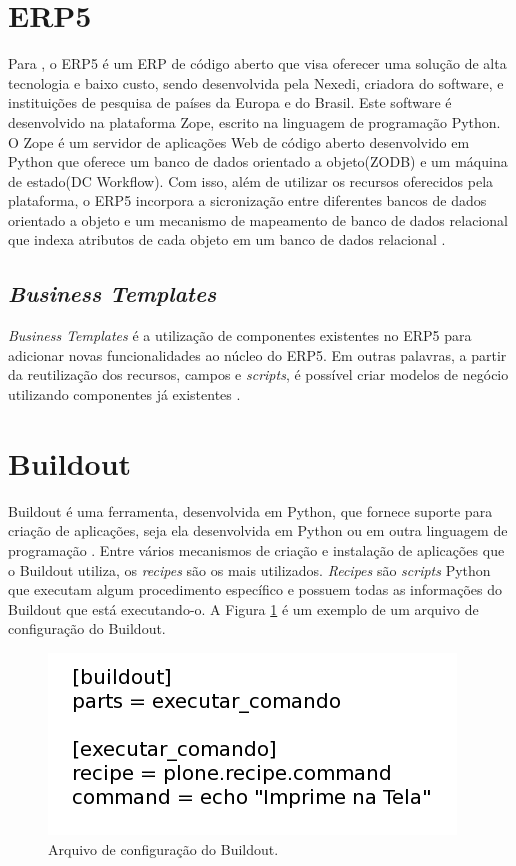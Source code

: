 \section{ERP5}

Para \cite{artigo:rogerio}, o ERP5 é um ERP de código aberto que visa oferecer uma solução de alta tecnologia e baixo custo, sendo desenvolvida pela Nexedi, criadora do software, e instituições de pesquisa de países da Europa e do Brasil. Este software é desenvolvido na plataforma Zope, escrito na linguagem de programação Python. O Zope é um servidor de aplicações Web de código aberto desenvolvido em Python \cite{python_zope} que oferece um banco de dados orientado a objeto(ZODB) e um máquina de estado(DC Workflow). Com isso, além de utilizar os recursos oferecidos pela plataforma, o ERP5 incorpora a sicronização entre diferentes bancos de dados orientado a objeto e um mecanismo de mapeamento de banco de dados relacional que indexa atributos de cada objeto em um banco de dados relacional \cite{handbook}.

\subsection{\textit{Business Templates}}
\textit{Business Templates} é a utilização de componentes existentes no ERP5 para adicionar novas funcionalidades ao núcleo do ERP5. Em outras palavras, a partir da reutilização dos recursos, campos e \textit{scripts}, é possível criar modelos de negócio utilizando componentes já existentes \cite{beautiful}.

\section{Buildout}

Buildout é uma ferramenta, desenvolvida em Python, que fornece suporte para criação de aplicações, seja ela desenvolvida em Python ou em outra linguagem de programação \cite{jim}. Entre vários mecanismos de criação e instalação de aplicações que o Buildout utiliza, os \textit{recipes} são os mais utilizados. \textit{Recipes} são \textit{scripts} Python que executam algum procedimento específico e possuem todas as informações do Buildout que está executando-o. A Figura \ref{buildout.png} é um exemplo de um arquivo de configuração do Buildout. 

\begin{figure}[ht]
 \centering
 \includegraphics[scale=0.50,bb=0 0 550 250]{buildout.png}
 \caption{Arquivo de configuração do Buildout.}
\label{buildout.png}
\end{figure}

